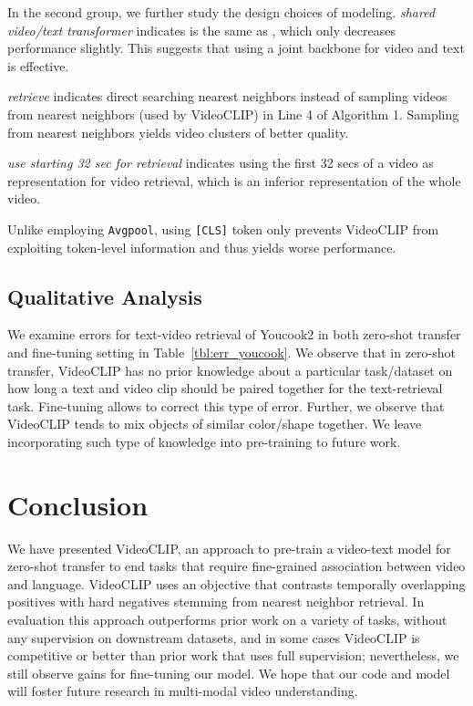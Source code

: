 \documentclass[11pt]{article}
\begin{document}
In the second group, we further study the design choices of modeling.
\textit{shared video/text transformer} indicates   is the same as , which only decreases performance slightly. This suggests that using a joint backbone for video and text is effective. 

\textit{retrieve } indicates direct searching  nearest neighbors instead of sampling  videos from  nearest neighbors (used by VideoCLIP) in Line 4 of Algorithm 1.
Sampling from nearest neighbors yields video clusters of better quality.

\textit{use starting 32 sec for retrieval} indicates using the first 32 secs of a video as representation for video retrieval, which is an inferior representation of the whole video.


Unlike employing \texttt{Avgpool}, using \texttt{[CLS]} token only prevents VideoCLIP from exploiting token-level information and thus yields worse performance.
























\subsection{Qualitative Analysis}




We examine errors for text-video retrieval of Youcook2 in both zero-shot transfer and fine-tuning setting in Table~\ref{tbl:err_youcook}.
We observe that in zero-shot transfer, VideoCLIP has no prior knowledge about a particular task/dataset on how long a text and video clip should be paired together for the text-retrieval task.
Fine-tuning allows to correct this type of error.
Further, we observe that VideoCLIP tends to mix objects of similar color/shape together.
We leave incorporating such type of knowledge into pre-training to future work.

\vspace{5pt}
\section{Conclusion}
We have presented VideoCLIP, an approach to pre-train a video-text model for zero-shot transfer to end tasks that require fine-grained association between video and language. VideoCLIP uses an objective that contrasts temporally overlapping positives with hard negatives stemming from nearest neighbor retrieval. 
In evaluation this approach outperforms prior work on a variety of tasks, without any supervision on downstream datasets, and in some cases VideoCLIP is competitive or better than prior work that uses full supervision; nevertheless, we still observe gains for fine-tuning our model. We hope that our code and model will foster future research in multi-modal video understanding. 
\end{document}
